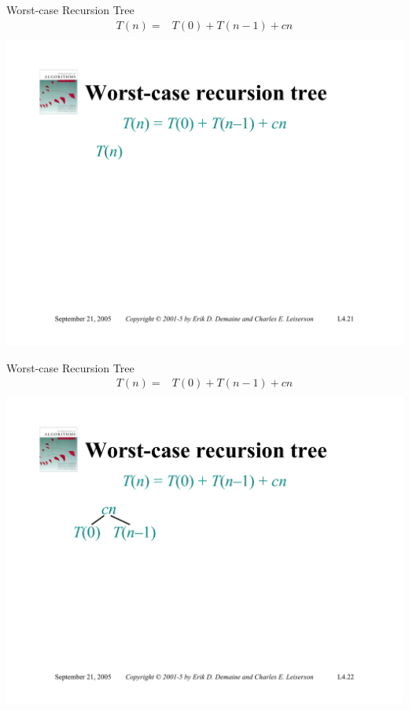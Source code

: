 \documentclass{beamer}
\begin{document}
\begin{frame}{Worst-case Recursion Tree}
    \begin{equation*}
        \begin{split}
            T(n) =& T(0) + T(n - 1) + cn \\
        \end{split}
    \end{equation*}
    \centering
    \includegraphics[width=\textwidth, trim={1.00cm 1.80cm 0.50cm 5.25cm}, clip]{pages/lec4_21}
\end{frame}
\begin{frame}{Worst-case Recursion Tree}
    \begin{equation*}
        \begin{split}
            T(n) =& T(0) + T(n - 1) + cn \\
        \end{split}
    \end{equation*}
    \centering
    \includegraphics[width=\textwidth, trim={1.00cm 1.80cm 0.50cm 5.25cm}, clip]{pages/lec4_22}
\end{frame}
\end{document}
